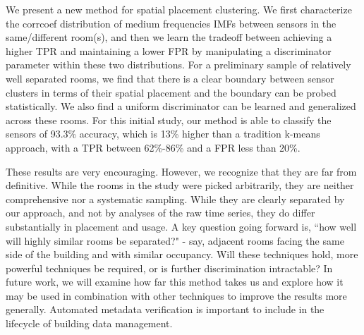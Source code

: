 We present a new method for spatial placement clustering.  
We first characterize the corrcoef distribution of medium frequencies IMFs between sensors in the same/different room(s), and then we learn the tradeoff between achieving a higher TPR and maintaining a lower FPR by manipulating a discriminator parameter within these two distributions. 
For a preliminary sample of relatively well separated rooms, we find that there is a clear boundary between sensor clusters in terms of their spatial placement and the boundary can be probed statistically.  We also find 
a uniform discriminator can be learned and generalized across these rooms.  
For this initial study, our method is able to classify the sensors of 93.3\% accuracy, which is 13\% higher than a tradition k-means approach, with a TPR between 62\%-86\% and a FPR less than 20\%. 

These results are very encouraging. However, we recognize that they are far from definitive. While the rooms in the study were picked arbitrarily, they are neither comprehensive nor a systematic sampling.  While they are clearly separated by our approach, and not by analyses of the raw time series, they do differ substantially in placement and usage.  A key question going forward is, ``how well will highly similar rooms be separated?"  - say, adjacent rooms facing the same side of the building and with similar occupancy. Will these techniques hold, more powerful techniques be required, or is further discrimination intractable? In future work, we will examine how far this method takes us and explore how it may be used in combination with other techniques to improve the results more generally. Automated metadata verification is important to include in the lifecycle of building data management.











